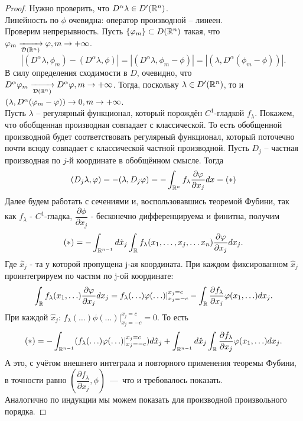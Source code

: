\begin{proof}
    Нужно проверить, что $D^{\alpha}\lambda \in D'(\mathbb{R}^n)$. \\
    Линейность по $\phi$ очевидна: оператор производной -- линеен. \\
    Проверим непрерывность.
    Пусть $\{\varphi_m\} \subset D(\mathbb{R}^n)$ такая, что $\varphi_m \xrightarrow[\mathcal{D} (\mathbb{R}^n)]{} \varphi, m \rightarrow +\infty$.
    \[
        |(D^{\alpha} \lambda, \phi_m) - (D^{\alpha} \lambda, \phi)| = |(D^{\alpha} \lambda, \phi_m - \phi)| = |(\lambda, D^{\alpha}(\phi_m - \phi))|.
    \]
    В силу определения сходимости в $D$, очевидно, что $D^{\alpha} \varphi_m \xrightarrow[\mathcal{D}(\mathbb{R}^n)]{} D^{\alpha} \varphi, m \rightarrow +\infty$.
    Тогда, поскольку $\lambda \in D'(\mathbb{R}^n)$, то и $(\lambda, D^{\alpha}(\varphi_m - \varphi)) \rightarrow 0, m \rightarrow +\infty$. \\
    Пусть $\lambda$ -- регулярный функционал, который порождён $C^1$-гладкой $f_\lambda$.
    Покажем, что обобщенная производная совпадает с классической. То есть обобщенной производной будет соответствовать регулярный функционал, который поточечно почти всюду совпадает с классической частной производной. Пусть $D_j$ -- частная производная по $j$-й координате в обобщённом смысле. Тогда
    \[
        (D_j \lambda, \varphi) = -(\lambda, D_j \varphi) = -\int_{\mathbb{R}^n} f_{\lambda} \dfrac{\partial \varphi}{\partial x_j}dx = (*)
    \]
    Далее будем работать с сечениями и, воспользовавшись теоремой Фубини, так как $f_{\lambda}$ - $C^1$-гладка, $\dfrac{\partial \phi}{\partial x_j}$ - бесконечно дифференцируема и финитна, получим
    \[
        (*) = -\int_{\mathbb{R}^{n - 1}} d\hat{x}_j \int_{\mathbb{R}} f_{\lambda}(x_1, \ldots, x_j, \ldots x_n) \dfrac{\partial \varphi}{\partial x_j} dx_j.
    \]
    Где $\hat{x}_j$ - та у которой пропущена j-ая координата. При каждом фиксированном $\hat{x}_j$ проинтегрируем по частям по j-ой координате:
    \[
        \int_{\mathbb{R}} f_{\lambda}(x_1, \ldots) \dfrac{\partial \varphi}{\partial x_j} dx_j = f_{\lambda}(\ldots)\varphi(\ldots)|^{x_j=c}_{x_j=-c} - \int_{\mathbb{R}} \dfrac{\partial f_{\lambda}}{\partial x_j} \varphi(x_1, \ldots) dx_j.
    \]
    При каждой $\hat{x}_j$:  $f_{\lambda}(\ldots)\phi(\ldots)|^{x_j=c}_{x_j=-c} = 0$. То есть
    \[
        (*) = -\int_{\mathbb{R}^{n - 1}} (f_{\lambda}(\ldots)\varphi(\ldots)|^{x_j=c}_{x_j=-c}) d\hat{x}_j + \int_{\mathbb{R}^{n - 1}} d\hat{x}_j \int_{\mathbb{R}} \dfrac{\partial f_{\lambda}}{\partial x_j} \varphi(x_1, \ldots) dx_j .
    \]
    А это, с учётом внешнего интеграла и повторного применения теоремы Фубини, в точности равно $\left(\dfrac{\partial f_{\lambda}}{\partial x_j}, \phi\right)$~---~что и требовалось показать. \\
    Аналогично по индукции мы можем показать для производной произвольного порядка.
\end{proof}
